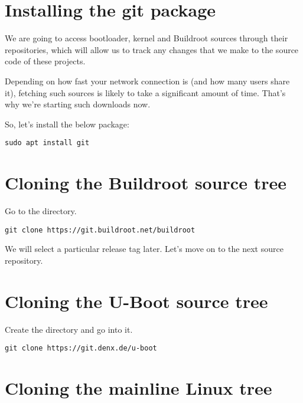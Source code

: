 
\section{Installing the git package}

We are going to access bootloader, kernel and Buildroot sources through
their  repositories, which will allow us to track any changes
that we make to the source code of these projects.

Depending on how fast your network connection is (and how many users
share it), fetching such sources is likely to take a significant amount
of time. That's why we're starting such downloads now.

So, let's install the below package:

\begin{verbatim}
sudo apt install git
\end{verbatim}

\section{Cloning the Buildroot source tree}

Go to the  directory.

\begin{verbatim}
git clone https://git.buildroot.net/buildroot
\end{verbatim}

We will select a particular release tag later. Let's move on to the next
source repository.

\section{Cloning the U-Boot source tree}

Create the  directory and go
into it.

\begin{verbatim}
git clone https://git.denx.de/u-boot
\end{verbatim}

\section{Cloning the mainline Linux tree}

